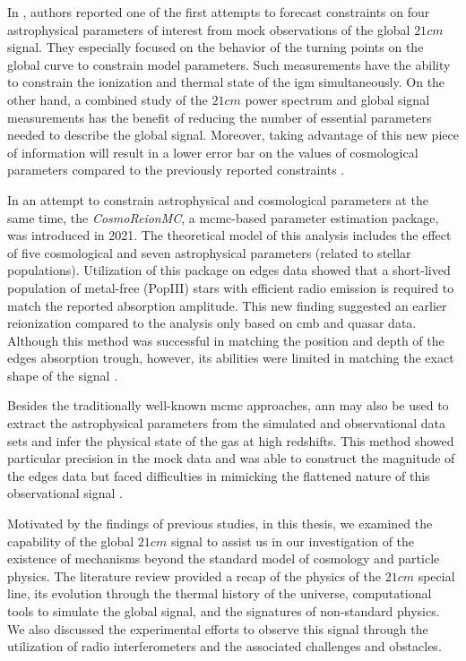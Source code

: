 \documentclass[12pt, TexShade, letterpaper]{report}
\begin{document}
In \cite{pe_galaxy_formation}, authors reported one of the first attempts to forecast constraints on four astrophysical parameters of interest from mock observations of the global $21cm$ signal. They especially focused on the behavior of the turning points on the global curve to constrain model parameters. Such measurements have the ability to constrain the ionization and thermal state of the \gls{igm} simultaneously. On the other hand, a combined study of the $21cm$ power spectrum and global signal measurements has the benefit of reducing the number of essential parameters needed to describe the global signal. Moreover, taking advantage of this new piece of information will result in a lower error bar on the values of cosmological parameters compared to the previously reported constraints \cite{21cmpower_global_comnbine}. \par

In an attempt to constrain astrophysical and cosmological parameters at the same time, the \emph{CosmoReionMC}, a \gls{mcmc}-based parameter estimation package, was introduced in 2021. The theoretical model of this analysis includes the effect of five cosmological and seven astrophysical parameters (related to stellar populations). Utilization of this package on \gls{edges} data showed that a short-lived population of metal-free (PopIII) stars with efficient radio emission is required to match the reported absorption amplitude. This new finding suggested an earlier reionization compared to the analysis only based on \gls{cmb} and quasar data. Although this method was successful in matching the position and depth of the \gls{edges} absorption trough, however, its abilities were limited in matching the exact shape of the signal \cite{pe_mcmc_1}.\par

Besides the traditionally well-known \gls{mcmc} approaches, \gls{ann} may also be used to extract the astrophysical parameters from the simulated and observational data sets and infer the physical state of the gas at high redshifts. This method showed particular precision in the mock data and was able to construct the magnitude of the \gls{edges} data but faced difficulties in mimicking the flattened nature of this observational signal \cite{pe_nn_1}.\par

Motivated by the findings of previous studies, in this thesis, we examined the capability of the global $21cm$ signal to assist us in our investigation of the existence of mechanisms beyond the standard model of cosmology and particle physics. The literature review provided a recap of the physics of the $21cm$ special line, its evolution through the thermal history of the universe, computational tools to simulate the global signal, and the signatures of non-standard physics. We also discussed the experimental efforts to observe this signal through the utilization of radio interferometers and the associated challenges and obstacles.\par
\end{document}
